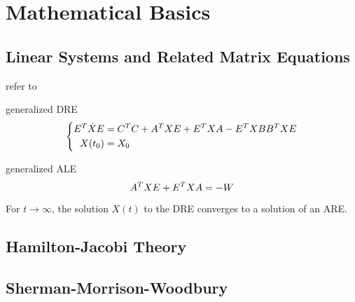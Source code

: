 \chapter{Mathematical Basics}
\section{Linear Systems and Related Matrix Equations}

refer to \cite{Simoncini2016}

generalized \ac{DRE}
\begin{equation}
\label{eq:basics:DRE}
\left\{
\begin{aligned}
  E^T \dot X E &= C^T C + A^T X E + E^T X A - E^T X BB^T X E \\
  X(t_0) &= X_0
\end{aligned}
\right.
\end{equation}

generalized \ac{ALE}
\begin{equation}
\label{eq:basics:ALE}
  A^T X E + E^T X A = -W
\end{equation}

\begin{proposition}
\label{thm:basics:dre-limit-are}
  For $t\to\infty$, the solution $X(t)$ to the \ac{DRE} converges to a solution of an \ac{ARE}.
\end{proposition}

\section{Hamilton-Jacobi Theory}
\section{Sherman-Morrison-Woodbury}
\label{sec:basics:smw}

